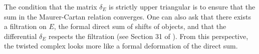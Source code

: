 

The condition that the matrix $\delta_E$ is strictly upper triangular is to ensure that the sum in the Maurer-Cartan relation converges. One can also ask that there exists a filtration on $E$, the formal direct sum of shifts of objects, and that the differential $\delta_E$ respects the filtration (see Section 31 of \cite{seidel2008fukaya}). From this perspective, the twisted complex looks more like a formal deformation of the direct sum.
 